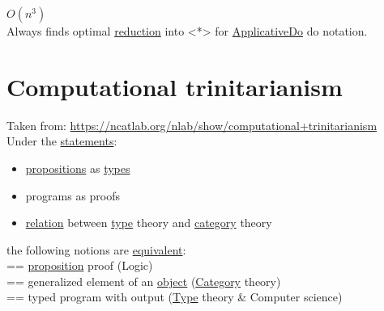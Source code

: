 \documentclass[a4paper,14pt,oneside]{book}
\begin{document}
{\(O(n^3)\)\\
Always finds optimal \hyperref[org2daf735]{reduction} into <*> for \hyperref[org8c9c529]{ApplicativeDo} do notation.\\

\chapter{\label{orge3dbd11}Computational trinitarianism}
\label{sec:org95c93a3}

Taken from: \url{https://ncatlab.org/nlab/show/computational+trinitarianism}\\

Under the \hyperref[orgf6daaf5]{statements}:\\

\begin{itemize}
\item \hyperref[org038788e]{propositions} as \hyperref[org51532d9]{types}\\

\item programs as proofs\\

\item \hyperref[orgc61e9ed]{relation} between \hyperref[orga9ca243]{type} theory and \hyperref[orgf2b19ad]{category} theory\\
\end{itemize}

the following notions are \hyperref[orgfc48fc8]{equivalent}:\\

== \hyperref[org7fbfcf5]{proposition} proof (Logic)\\

== generalized element of an \hyperref[orgcc1bbec]{object} (\hyperref[orgf2b19ad]{Category} theory)\\

== typed program with output (\hyperref[orga9ca243]{Type} theory \& Computer science)\\

}
\end{document}

